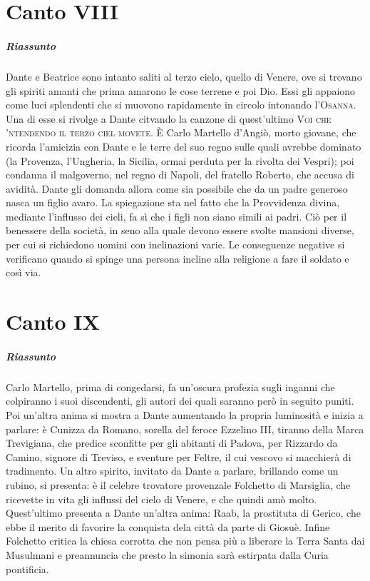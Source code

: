 \documentclass[a4paper, twoside, titlepage]{book}
\newcommand{\titolo}[1]{\textsc{#1}} %
\newcounter{mar}
\begin{document}
\chapter{Canto VIII}

\paragraph{Riassunto}  Dante e Beatrice sono intanto saliti al terzo cielo, quello di Venere, ove si trovano gli spiriti amanti che prima amarono le cose terrene e poi Dio. Essi gli appaiono come luci splendenti che si muovono rapidamente in circolo intonando l'\titolo{Osanna}. Una di esse si rivolge a Dante citvando la canzone di quest'ultimo \titolo{Voi che 'ntendendo il terzo ciel movete}. È Carlo Martello d'Angiò, morto giovane, che ricorda l'amicizia con Dante e le terre del suo regno sulle quali avrebbe dominato (la Provenza, l'Ungheria, la Sicilia, ormai perduta per la rivolta dei Vespri); poi condanna il malgoverno, nel regno di Napoli, del fratello Roberto, che accusa di avidità. Dante gli domanda allora come sia possibile che da un padre generoso nasca un figlio avaro. La spiegazione sta nel fatto che la Provvidenza divina, mediante l'influsso dei cieli, fa sì che i figli non siano simili ai padri. Ciò per il benessere della società, in seno alla quale devono essere svolte mansioni diverse, per cui si richiedono uomini con inclinazioni varie. Le conseguenze negative si verificano quando si spinge una persona incline alla religione a fare il soldato e così via.

\chapter{Canto IX}

\paragraph{Riassunto} Carlo Martello, prima di congedarsi, fa un'oscura profezia sugli inganni che colpiranno i suoi discendenti, gli autori dei quali saranno però in seguito puniti. Poi un'altra anima si mostra a Dante aumentando la propria luminosità e inizia a parlare: è Cunizza da Romano, sorella del feroce Ezzelino III, tiranno della Marca Trevigiana, che predice sconfitte per gli abitanti di Padova, per Rizzardo da Camino, signore di Treviso, e sventure per Feltre, il cui vescovo si macchierà di tradimento. Un altro spirito, invitato da Dante a parlare, brillando come un rubino, si presenta: è il celebre trovatore provenzale Folchetto di Marsiglia, che ricevette in vita gli influssi del cielo di Venere, e che quindi amò molto. Quest'ultimo presenta a Dante un'altra anima: Raab, la prostituta di Gerico, che ebbe il merito di favorire la conquista dela città da parte di Giosuè. Infine Folchetto critica la chiesa corrotta che non pensa più a liberare la Terra Santa dai Musulmani e preannuncia che presto la simonia sarà estirpata dalla Curia pontificia.
\end{document}
